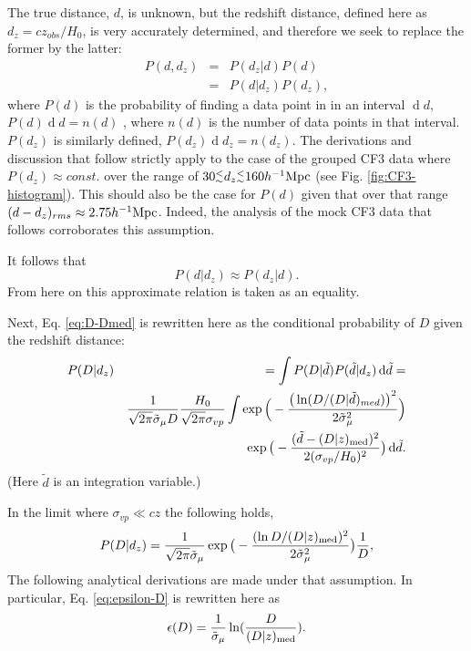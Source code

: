 \documentclass[useAMS,usenatbib]{mn2e}
\def\lesssim{{^<_\sim}}
\newcommand{\hmpc}{{\ifmmode{h^{-1}{\rm Mpc}}\else{$h^{-1}$Mpc}\fi}}
\renewcommand{\d}[1]{\ensuremath{\operatorname{d}\!{#1}}}
\begin{document}
The true distance, $d$, is unknown, but the redshift distance, defined here as $d_z=cz_{obs}/H_0$,  is very accurately determined, and therefore we seek to replace the former by the latter:
\begin{eqnarray}
P(d,d_z) &=& P(d_z|d) P(d)                     \\
              &=& P(d|d_z) P(d_z),   \nonumber
\label{eq:PdPdz-1}              
\end{eqnarray}
where $P(d)$ is the probability of finding a data point in in an interval 
$\d{d}$,   $P(d)\d{d} = n(d)$  , where $n(d)$ is the number of data points in that interval. $P(d_z)$ is similarly defined, $P(d_z)\d{d_z}=n(d_z)$. 
The derivations and discussion  that follow strictly apply to the case of the grouped CF3 data where $P(d_z)\approx const.$ over the range of $30 \lesssim d_z \lesssim 160 \hmpc$ (see
Fig. \ref{fig:CF3-histogram}). 
This should also be  the case for $P(d)$ given that over that range 
$(d - d_z)_{rms} \approx 2.75 \hmpc $. Indeed,  the analysis of the mock CF3 data that follows  corroborates  this assumption. 

It follows that  
\begin{equation}
P(d|d_z) \approx  P(d_z|d).
\label{eq:PdPdz-2}              
\end{equation}
From here on this approximate relation is taken as an equality.


Next, Eq. \ref{eq:D-Dmed} is rewritten here as the conditional probability of $D$ given the redshift distance: 
\begin{eqnarray}
P(D|d_z)& &=\int P(D|\tilde{d}) P(\tilde{d}|d_z) \d{\tilde{d}} =  \\
               & &{1\over \sqrt{2\pi}\tilde{\sigma}_\mu D} {H_0\over \sqrt{2\pi}\sigma_{vp}} 
                \int\exp\Big( -{\big(\ln(D/(D|\tilde{d})_{med})\big)^2\over 2 \tilde{\sigma}{_\mu^2}}   \Big)  \nonumber \\
               & &\exp\big( -{(\tilde{d}-(D|z)_{\rm med})^2\over 2 (\sigma_{vp}/H_0)^2}   \big) \d{\tilde{d}}.  \nonumber
\label{eq:PdPdz-3}               
\end{eqnarray}
(Here $\tilde{d}$ is an integration variable.)

In the limit where  $\sigma_{vp} \ll cz$ the following holds,
\begin{equation}
P(D\vert d_z)={1\over \sqrt{2\pi}\tilde{\sigma}_\mu} \exp\big( -{(\ln{D/(D|z)_{\rm med}})^2\over 2 \tilde{\sigma}{_\mu^2}}   \big) {1\over D},
\label{eq:D-z}
\end{equation}
The following analytical derivations are made under that assumption. In particular, Eq. \ref{eq:epsilon-D} is rewritten here as
\begin{equation}
\epsilon(D)={1\over\tilde{\sigma}_\mu}\ln({D\over  (D\vert z)_{\rm med}}).
\label{eq:epsilon-D-z}
\end{equation}
\end{document}
